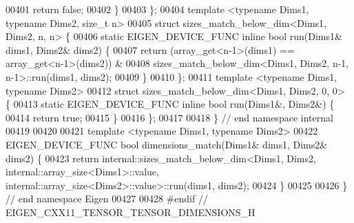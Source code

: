\begin{DoxyCode}
00401     \textcolor{keywordflow}{return} \textcolor{keyword}{false};
00402   \}
00403 \};
00404 \textcolor{keyword}{template} <\textcolor{keyword}{typename} Dims1, \textcolor{keyword}{typename} Dims2, \textcolor{keywordtype}{size\_t} n>
00405 \textcolor{keyword}{struct }sizes\_match\_below\_dim<Dims1, Dims2, n, n> \{
00406   \textcolor{keyword}{static} EIGEN\_DEVICE\_FUNC  \textcolor{keyword}{inline} \textcolor{keywordtype}{bool} run(Dims1& dims1, Dims2& dims2) \{
00407     \textcolor{keywordflow}{return} (array\_get<n-1>(dims1) == array\_get<n-1>(dims2)) &
00408         sizes\_match\_below\_dim<Dims1, Dims2, n-1, n-1>::run(dims1, dims2);
00409   \}
00410 \};
00411 \textcolor{keyword}{template} <\textcolor{keyword}{typename} Dims1, \textcolor{keyword}{typename} Dims2>
00412 \textcolor{keyword}{struct }sizes\_match\_below\_dim<Dims1, Dims2, 0, 0> \{
00413   \textcolor{keyword}{static} EIGEN\_DEVICE\_FUNC  \textcolor{keyword}{inline} \textcolor{keywordtype}{bool} run(Dims1&, Dims2&) \{
00414     \textcolor{keywordflow}{return} \textcolor{keyword}{true};
00415   \}
00416 \};
00417 
00418 \} \textcolor{comment}{// end namespace internal}
00419 
00420 
00421 \textcolor{keyword}{template} <\textcolor{keyword}{typename} Dims1, \textcolor{keyword}{typename} Dims2>
00422 EIGEN\_DEVICE\_FUNC \textcolor{keywordtype}{bool} dimensions\_match(Dims1& dims1, Dims2& dims2) \{
00423   \textcolor{keywordflow}{return} internal::sizes\_match\_below\_dim<Dims1, Dims2, internal::array\_size<Dims1>::value, 
      internal::array\_size<Dims2>::value>::run(dims1, dims2);
00424 \}
00425 
00426 \} \textcolor{comment}{// end namespace Eigen}
00427 
00428 \textcolor{preprocessor}{#endif // EIGEN\_CXX11\_TENSOR\_TENSOR\_DIMENSIONS\_H}
\end{DoxyCode}
